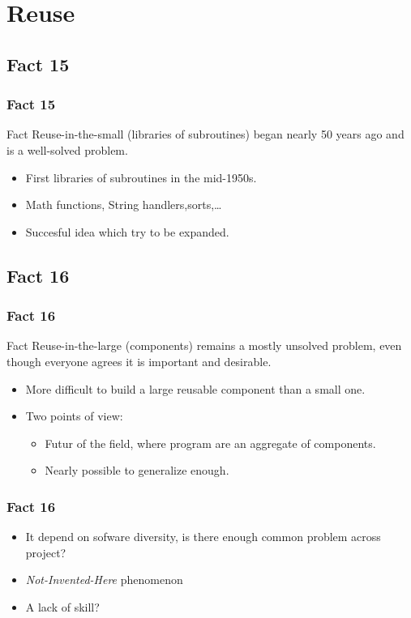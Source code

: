\documentclass{beamer}
\begin{document}
\section{Reuse}

\subsection{Fact 15}
\begin{frame}
    \frametitle{Fact 15}
    \begin{block}{Fact}
    Reuse-in-the-small (libraries of subroutines) began nearly 50 years ago and
    is a well-solved problem.
    \end{block}
    \begin{itemize}
    		\item First libraries of subroutines in the mid-1950s.
    		\item Math functions, String handlers,sorts,\ldots
    		\item Succesful idea which try to be expanded.
    \end{itemize}
\end{frame}

\subsection{Fact 16}
\begin{frame}
    \frametitle{Fact 16}
    \begin{block}{Fact}
    Reuse-in-the-large (components) remains a mostly unsolved problem, even
    though everyone agrees it is important and desirable.
    \end{block}
    \begin{itemize}
    		\item More difficult to build a large reusable component than a small one.
    		\item Two points of view:
    		\begin{itemize}
    			\item Futur of the field, where program are an aggregate of components.
    			\item Nearly possible to generalize enough.
    		\end{itemize} 		
    \end{itemize}
\end{frame}

\begin{frame}
	\frametitle{Fact 16}
	\begin{itemize}
		\item It depend on sofware diversity, is there enough common problem across project?
		\item \textit{Not-Invented-Here} phenomenon
		\item A lack of skill?
	\end{itemize}

\end{frame}
\end{document}
